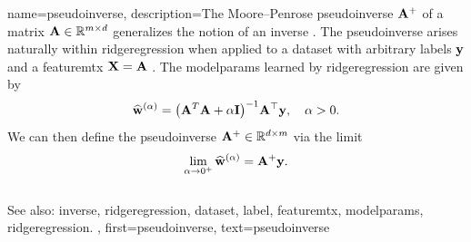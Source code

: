 
{name={pseudoinverse},
  description={The Moore–Penrose pseudoinverse ${\bf A}^{+}$ 
 	of a matrix ${\bf A} \in \mathbb{R}^{m \times d}$ generalizes the 
 	notion of an \gls{inverse} \cite{GolubVanLoanBook}. The pseudoinverse arises naturally 
 	within \gls{ridgeregression} when applied to a \gls{dataset} with arbitrary \glspl{label} ${\bf y}$ 
 	and a \gls{featuremtx} ${\bf X} = {\bf A}$ \cite[Ch.\ 3]{hastie01statisticallearning}. The \gls{modelparams} 
 	learned by \gls{ridgeregression} 
  	are given by
  	\[
  	\widehat{{\bf w}}^{(\alpha)}  = \big({\bf A}^T {\bf A} + \alpha \mathbf{I} \big)^{-1} {\bf A}^\top {\bf y}, \quad \alpha > 0.
  	\]
  	We can then define the pseudoinverse  ${\bf A}^+ \in \mathbb{R}^{d \times m}$ via 
  	the limit \cite[Ch. 3]{benisrael2003generalized}
  	\[
  	\lim_{\alpha \to 0^+} \widehat{{\bf w}}^{(\alpha)} = {\bf A}^+ {\bf y}.
  	\]
	\\
	See also: \gls{inverse}, \gls{ridgeregression}, \gls{dataset}, \gls{label}, \gls{featuremtx}, \gls{modelparams}, \gls{ridgeregression}.
	},
 first={pseudoinverse},
 text={pseudoinverse}
}

